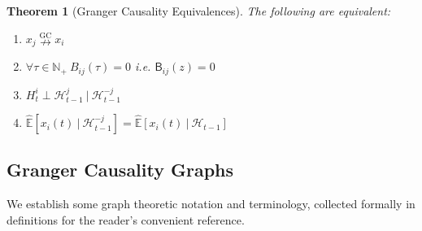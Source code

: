 \documentclass{statsoc}
\def\ngc{\overset{\text{GC}}{\nrightarrow}}  %
\def\B{\mathsf{B}}  %
\def\H{\mathcal{H}}  %
\newcommand{\linE}[2]{\hat{\E}[#1\ |\ #2]}  %
\newtheorem{theorem}{Theorem}
\def\H{\mathcal{H}}  %
\def\E{\mathbb{E}}  %
\def\N{\mathbb{N}}  %
\begin{document}
\begin{theorem}[Granger Causality Equivalences]
  \label{thm:granger_causality_equivalences}
  The following are equivalent:

  \begin{enumerate}
    \item{$x_j \ngc x_i$}
    \item{$\forall \tau \in \N_+\ B_{ij}(\tau) = 0$ i.e. $\B_{ij}(z) = 0$}
    \item{$H_t^{i} \perp \H_{t - 1}^{j}\ |\ \H_{t - 1}^{-j}$}
    \item{$\linE{x_i(t)}{\H_{t - 1}^{-j}} = \linE{x_i(t)}{\H_{t - 1}}$}
  \end{enumerate}
\end{theorem}



\subsection{Granger Causality Graphs}
We establish some graph theoretic notation and terminology, collected
formally in definitions for the reader's convenient reference.
\end{document}
